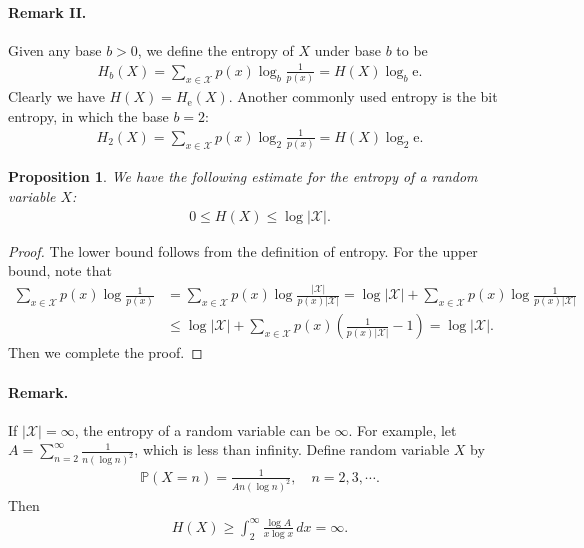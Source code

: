 \documentclass{article}
\numberwithin{equation}{section}
\newcommand{\e}{\mathrm{e}}
\newcommand{\bbP}{\mathbb{P}}
\renewcommand{\cal}{\mathcal}
\theoremstyle{plain}
\newtheorem{proposition}[theorem]{Proposition}
\theoremstyle{definition}
\begin{document}
\paragraph{Remark II.} Given any base $b>0$, we define the entropy of $X$ under base $b$ to be
\begin{align*}
	H_b(X)=\sum_{x\in\mathcal{X}}p(x)\log_b\frac{1}{p(x)}=H(X)\log_b\e.
\end{align*}
Clearly we have $H(X)=H_\e(X)$. Another commonly used entropy is the bit entropy, in which the base $b=2$:
\begin{align*}
	H_2(X)=\sum_{x\in\mathcal{X}}p(x)\log_2\frac{1}{p(x)}=H(X)\log_2\e.
\end{align*}

\begin{proposition}
We have the following estimate for the entropy of a random variable $X$:
\begin{align*}
	0\leq H(X)\leq\log\vert\mathcal{X}\vert.
\end{align*}
\end{proposition}
\begin{proof}
The lower bound follows from the definition of entropy. For the upper bound, note that
\begin{align*}
	\sum_{x\in\mathcal{X}}p(x)\log\frac{1}{p(x)}&=\sum_{x\in\mathcal{X}}p(x)\log\frac{\vert\mathcal{X}\vert}{p(x)\vert\mathcal{X}\vert}=\log\vert\mathcal{X}\vert+\sum_{x\in\mathcal{X}}p(x)\log\frac{1}{p(x)\vert\mathcal{X}\vert}\\
	&\leq\log\vert\mathcal{X}\vert+\sum_{x\in\mathcal{X}}p(x)\left(\frac{1}{p(x)\vert\mathcal{X}\vert}-1\right)=\log\vert\mathcal{X}\vert.
\end{align*}
Then we complete the proof.
\end{proof}

\paragraph{Remark.} If $\vert\cal{X}\vert=\infty$, the entropy of a random variable can be $\infty$. For example, let $A=\sum_{n=2}^\infty\frac{1}{n(\log n)^2}$, which is less than infinity. Define random variable $X$ by
\begin{align*}
	\bbP(X=n)=\frac{1}{An(\log n)^2},\quad n=2,3,\cdots.
\end{align*}
Then
\begin{align*}
	H(X)\geq\int_2^{\infty}\frac{\log A}{x\log x}\,dx=\infty.
\end{align*}
\end{document}
